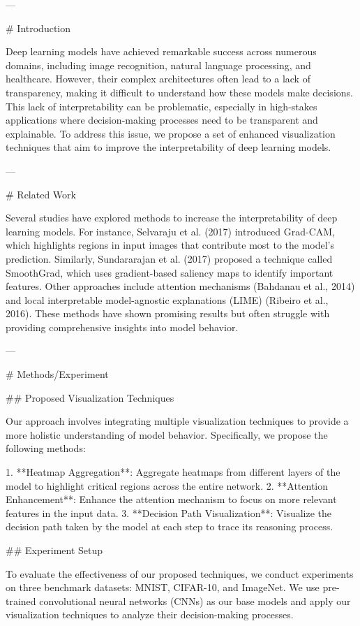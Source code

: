 ---

# Introduction

Deep learning models have achieved remarkable success across numerous domains, including image recognition, natural language processing, and healthcare. However, their complex architectures often lead to a lack of transparency, making it difficult to understand how these models make decisions. This lack of interpretability can be problematic, especially in high-stakes applications where decision-making processes need to be transparent and explainable. To address this issue, we propose a set of enhanced visualization techniques that aim to improve the interpretability of deep learning models.

---

# Related Work

Several studies have explored methods to increase the interpretability of deep learning models. For instance, Selvaraju et al. (2017) introduced Grad-CAM, which highlights regions in input images that contribute most to the model's prediction. Similarly, Sundararajan et al. (2017) proposed a technique called SmoothGrad, which uses gradient-based saliency maps to identify important features. Other approaches include attention mechanisms (Bahdanau et al., 2014) and local interpretable model-agnostic explanations (LIME) (Ribeiro et al., 2016). These methods have shown promising results but often struggle with providing comprehensive insights into model behavior.

---

# Methods/Experiment

## Proposed Visualization Techniques

Our approach involves integrating multiple visualization techniques to provide a more holistic understanding of model behavior. Specifically, we propose the following methods:

1. **Heatmap Aggregation**: Aggregate heatmaps from different layers of the model to highlight critical regions across the entire network.
2. **Attention Enhancement**: Enhance the attention mechanism to focus on more relevant features in the input data.
3. **Decision Path Visualization**: Visualize the decision path taken by the model at each step to trace its reasoning process.

## Experiment Setup

To evaluate the effectiveness of our proposed techniques, we conduct experiments on three benchmark datasets: MNIST, CIFAR-10, and ImageNet. We use pre-trained convolutional neural networks (CNNs) as our base models and apply our visualization techniques to analyze their decision-making processes.

